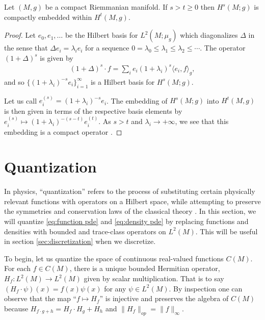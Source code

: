\documentclass[final,leqno]{siamltex1213}
\begin{document}
\begin{proposition} \label{prop:compact_embedding}
	Let $(M,g)$ be a compact Riemmanian manifold.  If $s > t \geq 0$ then $H^s(M;g)$ is compactly embedded within $H^t(M,g)$.
\end{proposition}
\begin{proof}
	Let $e_0, e_1,\dots$ be the Hilbert basis for $L^2(M;\mu_g)$ which diagonalizes $\Delta$
	in the sense that $\Delta e_i = \lambda_i e_i$ for a sequence $0 = \lambda_0 \leq \lambda_1 \leq \lambda_2 \leq \cdots$.
	The operator $(1+\Delta)^s$ is given by
	\begin{align}
		(1+\Delta)^s \cdot f =  \sum_{i} e_i (1+\lambda_i)^s \langle e_i , f \rangle_g,
	\end{align}
	and so $\{ (1+ \lambda_i)^{-s} e_i \}_{i=1}^{\infty}$ is a Hilbert basis for $H^s(M;g)$.
	
	Let us call $e_i^{(s)} = (1+ \lambda_i)^{-s} e_i$.
	The embedding of $H^s(M;g)$ into $H^t(M,g)$
	is then given in terms of the respective basis elements by $e_i^{(s)} \mapsto (1+\lambda_i)^{-(s-t)}e_i^{(t)}$.
	As $s > t$ and $\lambda_i \to +\infty$, we see that 
	this embedding is a compact operator \cite[Proposition 4.6]{Conway1990}.
\end{proof}



\section{Quantization} \label{sec:quantization}
In physics, ``quantization'' refers to the process of substituting certain physically relevant functions with operators on a Hilbert space, while attempting to preserve the symmetries and conservation laws of the classical theory
\cite{BatesWeinstein1997,Dirac2013,GuilleminSternberg1970}.
In this section, we will quantize \eqref{eq:function pde} and \eqref{eq:density pde} by replacing functions and densities with bounded and trace-class operators on $L^{2}(M)$.
This will be useful in section \ref{sec:discretization} when we discretize.

To begin, let us quantize the space of continuous real-valued functions $C(M)$.
For each $f \in C(M)$, there is a unique bounded Hermitian operator, $H_{f} : L^{2}(M) \to L^{2}(M)$ given by scalar multiplication.
That is to say $(H_{f} \cdot \psi) (x) = f(x) \psi(x)$ for any $\psi \in L^{2}(M)$.
By inspection one can observe that the map ``$f \mapsto H_{f}$'' is injective and preserves the algebra of $C(M)$ because $H_{f\cdot g + h} = H_{f} \cdot H_{g} + H_{h}$ and $\| H_{f} \|_{op} = \| f \|_{\infty}$.
\end{document}
